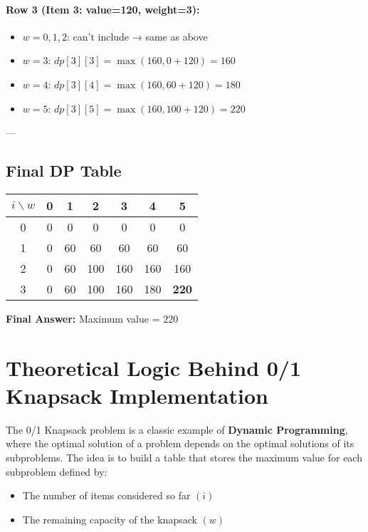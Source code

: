\documentclass[14pt]{extarticle}
\begin{document}
\paragraph{Row 3 (Item 3: value=120, weight=3):}

\begin{itemize}
    \item $w = 0,1,2$: can't include → same as above
    \item $w = 3$: $dp[3][3] = \max(160, 0 + 120) = 160$
    \item $w = 4$: $dp[3][4] = \max(160, 60 + 120) = 180$
    \item $w = 5$: $dp[3][5] = \max(160, 100 + 120) = \boxed{220}$
\end{itemize}

---

\subsection*{Final DP Table}

\begin{center}
\renewcommand{\arraystretch}{1.3}
\begin{tabular}{|c|c|c|c|c|c|c|}
\hline
$i \backslash w$ & 0 & 1 & 2 & 3 & 4 & 5 \\
\hline
0 & 0 & 0 & 0 & 0 & 0 & 0 \\
1 & 0 & 60 & 60 & 60 & 60 & 60 \\
2 & 0 & 60 & 100 & 160 & 160 & 160 \\
3 & 0 & 60 & 100 & 160 & 180 & \textbf{220} \\
\hline
\end{tabular}
\end{center}

\textbf{Final Answer: } \quad Maximum value = $\boxed{220}$


\section{Theoretical Logic Behind 0/1 Knapsack Implementation}

The 0/1 Knapsack problem is a classic example of \textbf{Dynamic Programming}, where the optimal solution of a problem depends on the optimal solutions of its subproblems. The idea is to build a table that stores the maximum value for each subproblem defined by:

\begin{itemize}
    \item The number of items considered so far $(i)$
    \item The remaining capacity of the knapsack $(w)$
\end{itemize}
\end{document}
